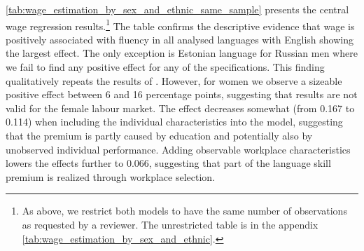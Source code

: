 \documentclass[12pt, a4paper]{article}
\begin{document}
\cref{tab:wage_estimation_by_sex_and_ethnic_same_sample} presents the
central wage regression
results.\footnote{As above, we
restrict both models to have the same number of observations as
requested by a reviewer. The unrestricted table is in the appendix \cref{tab:wage_estimation_by_sex_and_ethnic}.}
The table
confirms the descriptive evidence that wage is positively associated
with fluency in all analysed languages with English showing the
largest effect. The only exception is
Estonian language for Russian men where we fail to find any positive
effect for any of the specifications. This finding qualitatively repeats the results of
\citet{Toomet2011}. However, for women we observe a sizeable
positive effect between 6 and 16 percentage points, suggesting that
\citet{Toomet2011} results are not valid for the female labour market. The effect decreases somewhat
(from 0.167 to 0.114) when including the individual characteristics
into the model, suggesting that the premium
is partly caused by education and potentially also by unobserved
individual performance. Adding observable workplace characteristics
lowers the effects further to 0.066, suggesting that part of the
language skill premium is realized through workplace selection.
\end{document}

